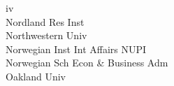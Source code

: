 \documentclass[a4paper]{article}
\begin{document}
\begin{multicols*}{2}
\begin{footnotesize}
iv \\ Nordland Res Inst \\ Northwestern Univ \\ Norwegian Inst Int Affairs NUPI \\ Norwegian Sch Econ \& Business Adm \\ Oakland Univ
\end{footnotesize}
\end{multicols*}
\end{document}
